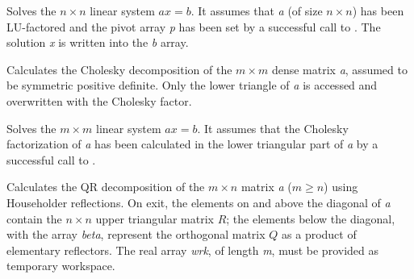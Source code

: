 \documentclass[letterpaper,10pt,english]{sphinxmanual}
\begin{document}

\begin{fulllineitems}
\label{linear_solvers/DLS:c.denseGETRS}
Solves the \(n \times n\) linear system \(ax = b\). It
assumes that \emph{a} (of size \(n \times n\)) has been LU-factored
and the pivot array \emph{p} has been set by a successful call to
{\hyperref[linear_solvers/DLS:c.denseGETRF]{\emph{}}}. The solution \emph{x} is written into the \emph{b}
array.

\end{fulllineitems}


\begin{fulllineitems}
\label{linear_solvers/DLS:c.densePOTRF}
Calculates the Cholesky decomposition of the \(m \times m\)
dense matrix \emph{a}, assumed to be symmetric positive definite.  Only
the lower triangle of \emph{a} is accessed and overwritten with the
Cholesky factor.

\end{fulllineitems}


\begin{fulllineitems}
\label{linear_solvers/DLS:c.densePOTRS}
Solves the \(m \times m\) linear system \(ax = b\).  It
assumes that the Cholesky factorization of \emph{a} has been calculated
in the lower triangular part of \emph{a} by a successful call to
.

\end{fulllineitems}


\begin{fulllineitems}
\label{linear_solvers/DLS:c.denseGEQRF}
Calculates the QR decomposition of the \(m \times n\) matrix
\emph{a} (\(m \ge n\)) using Householder reflections.  On exit, the
elements on and above the diagonal of \emph{a} contain the \(n
\times n\) upper triangular matrix \(R\); the elements below the
diagonal, with the array \emph{beta}, represent the orthogonal matrix
\(Q\) as a product of elementary reflectors. The real array
\emph{wrk}, of length \emph{m}, must be provided as temporary workspace.

\end{fulllineitems}
\end{document}
